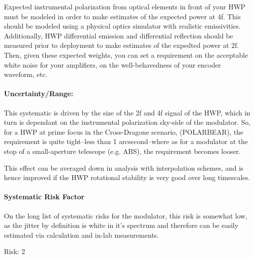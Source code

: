 Expected instrumental polarization from optical elements in front of your HWP must be modeled in order to make estimates of the expected power at 4f. This should be modeled using a physical optics simulator with realistic emissivities. Additionally, HWP differential emission and differential reflection should be measured prior to deployment to make estimates of the expedted power at 2f. Then, given these expected weights, you can set a requirement on the acceptable white noise for your amplifiers, on the well-behavedness of your encoder waveform, etc.

\paragraph{Uncertainty/Range:}

This systematic is driven by the size of the 2f and 4f signal of the HWP, which in turn is dependant on the instrumental polarization sky-side of the modulator. So, for a HWP at prime focus in the Cross-Dragone scenario, (POLARBEAR), the requirement is quite tight--less than 1 arcsecond--where as for a modulator at the stop of a small-aperture telescope (e.g. ABS), the requirement becomes looser.

This effect can be averaged down in analysis with interpolation schemes, and is hence improved if the HWP rotational stability is very good over long timescales.

\paragraph{Systematic Risk Factor}

On the long list of systematic risks for the modulator, this risk is somewhat low, as the jitter by definition is white in it's spectrum and therefore can be easily estimated via calculation and in-lab measurements.

Risk: 2